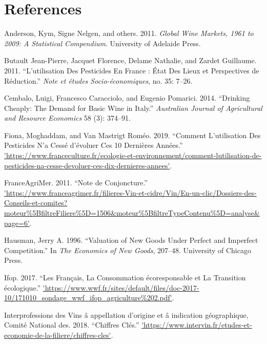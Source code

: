 \documentclass[11pt,]{article}
\begin{document}
\FloatBarrier

\newpage

\hypertarget{references}{%
\section*{References}\label{references}}

\hypertarget{refs}{}
\leavevmode\hypertarget{ref-anderson2011global}{}%
Anderson, Kym, Signe Nelgen, and others. 2011. \emph{Global Wine
Markets, 1961 to 2009: A Statistical Compendium}. University of Adelaide
Press.

\leavevmode\hypertarget{ref-Butault2011}{}%
Butault Jean-Pierre, Jacquet Florence, Delame Nathalie, and Zardet
Guillaume. 2011. ``L'utilisation Des Pesticides En France : État Des
Lieux et Perspectives de Réduction.'' \emph{Note et études
Socio-économiques}, no. 35: 7--26.

\leavevmode\hypertarget{ref-cembalo2014}{}%
Cembalo, Luigi, Francesco Caracciolo, and Eugenio Pomarici. 2014.
``Drinking Cheaply: The Demand for Basic Wine in Italy.''
\emph{Australian Journal of Agricultural and Resource Economics} 58 (3):
374--91.

\leavevmode\hypertarget{ref-Moghaddam2019}{}%
Fiona, Moghaddam, and Van Mastrigt Roméo. 2019. ``Comment L'utilisation
Des Pesticides N'a Cessé d'évoluer Ces 10 Dernières Années.''
\url{'https://www.franceculture.fr/ecologie-et-environnement/comment-lutilisation-de-pesticides-na-cesse-devoluer-ces-dix-dernieres-annees'}.

\leavevmode\hypertarget{ref-FranceAgriMer2011}{}%
FranceAgriMer. 2011. ``Note de Conjoncture.''
\url{'https://www.franceagrimer.fr/filieres-Vin-et-cidre/Vin/En-un-clic/Dossiers-des-Conseils-et-comites?moteur\%5BfiltreFiliere\%5D=1506\&moteur\%5BfiltreTypeContenu\%5D=analyse\&page=6'}.

\leavevmode\hypertarget{ref-hausman1996valuation}{}%
Hausman, Jerry A. 1996. ``Valuation of New Goods Under Perfect and
Imperfect Competition.'' In \emph{The Economics of New Goods}, 207--48.
University of Chicago Press.

\leavevmode\hypertarget{ref-Ifop2017}{}%
Ifop. 2017. ``Les Français, La Consommation écoresponsable et La
Transition écologique.''
\url{'https://www.wwf.fr/sites/default/files/doc-2017-10/171010_sondage_wwf_ifop_agriculture\%202.pdf'}.

\leavevmode\hypertarget{ref-CNIV2018}{}%
Interprofessions des Vins â appellation d'origine et â indication
géographique, Comité National des. 2018. ``Chiffres Clés.''
\url{'https://www.intervin.fr/etudes-et-economie-de-la-filiere/chiffres-cles'}.
\end{document}

